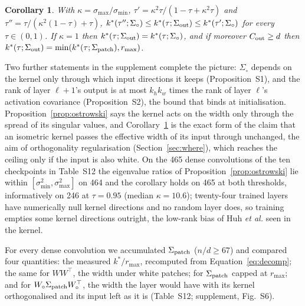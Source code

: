 \documentclass[10pt,journal,compsoc]{IEEEtran}
\newtheorem{corollary}{Corollary}
\begin{document}
\begin{corollary}
\label{cor:kstar}
With $\kappa = \sigma_{\max}/\sigma_{\min}$, $\tau' = \kappa^2\tau / (1 - \tau + \kappa^2 \tau)$ and $\tau'' = \tau / (\kappa^2 (1 - \tau) + \tau)$,
$k^*(\tau''; \Sigma_{\circ}) \le k^*(\tau; \Sigma_{\rm out}) \le k^*(\tau'; \Sigma_{\circ})$ for every $\tau \in (0, 1)$.
If $\kappa = 1$ then $k^*(\tau; \Sigma_{\rm out}) = k^*(\tau; \Sigma_{\circ})$, and if moreover
$C_{\rm out} \ge d$ then $k^*(\tau; \Sigma_{\rm out}) = \min(k^*(\tau; \Sigma_{\rm patch}), r_{\max})$.
\end{corollary}

Two further statements in the supplement complete the picture:
$\Sigma_{\circ}$ depends on the kernel only through which input
directions it keeps (Proposition~S1), and the rank of layer $\ell + 1$'s
output is at most $k_h k_w$ times the rank of layer $\ell$'s activation
covariance (Proposition~S2), the bound that binds at initialisation.
Proposition~\ref{prop:ostrowski} says the kernel acts on
the width only through the spread of its singular values, and
Corollary~\ref{cor:kstar} is the exact form of the claim that an isometric
kernel passes the effective width of its input through unchanged, the aim
of orthogonality regularisation (Section~\ref{sec:where}), which reaches
the ceiling only if the input is also white. On the 465 dense convolutions of the ten checkpoints in
Table~S12 the eigenvalue ratios of
Proposition~\ref{prop:ostrowski} lie within
$[\sigma_{\min}^2, \sigma_{\max}^2]$ on 464 and the corollary holds on 465
at both thresholds, informatively on 246 at $\tau = 0.95$ (median
$\kappa = 10.6$); twenty-four trained layers have numerically null kernel
directions and no random layer does, so training empties some kernel
directions outright, the low-rank bias of Huh \emph{et al.}
\cite{huh2023lowRank} seen in the kernel.

For every dense convolution we accumulated $\Sigma_{\rm patch}$
($n/d \ge 67$) and compared four quantities: the measured $k^*/r_{\max}$,
recomputed from Equation~\eqref{eq:decomp}; the same for $WW^{\top}$, the
width under white patches; for $\Sigma_{\rm patch}$ capped at $r_{\max}$;
and for $W_{\circ}\Sigma_{\rm patch}W_{\circ}^{\top}$, the width the layer
would have with its kernel orthogonalised and its input left as it is
(Table~S12; supplement, Fig.~S6).
\end{document}
